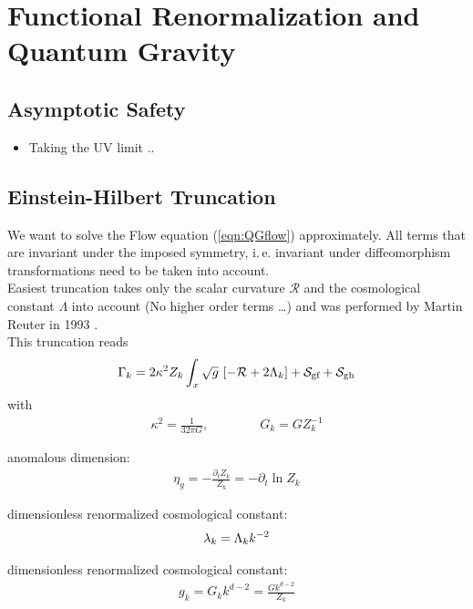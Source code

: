 \chapter{Functional Renormalization and Quantum Gravity}\label{chap:EHT}
\section{Asymptotic Safety}
\begin{itemize}
	\item Taking the UV limit ..
\end{itemize}
\section{Einstein-Hilbert Truncation}
We want to solve the Flow equation (\ref{eqn:QGflow}) approximately. All terms that are invariant under the imposed symmetry, i.\,e. invariant under diffeomorphism transformations need to be taken into account. \\

Easiest truncation takes only the scalar curvature $\mathcal{R}$ and the cosmological constant $\Lambda$ into account (No higher order terms \dots) and was performed by Martin Reuter in 1993 \cite{ReuterSaueressig2002}. \\


This truncation reads
\begin{align}
	\Gamma_{k} = 2\kappa^2Z_k \int_x \sqrt{g} \ [-\mathcal{R} + 2\Lambda_k] + \mathcal{S}_{\text{gf}} + \mathcal{S}_{\text{gh}}
\label{eqn:QGflow}
\end{align}
with 
\begin{align}
	\kappa^2 = \frac{1}{32\pi G}, \qquad\qquad G_k = GZ^{-1}_k
\end{align}



anomalous dimension: 
\begin{align*}
	\eta_g = -\frac{\partial_t Z_k}{Z_k} = -\partial_t \ln Z_k
\end{align*}

dimensionless renormalized cosmological constant:
\begin{align*}
	\lambda_k = \Lambda_k k^{-2}
\end{align*}

dimensionless renormalized cosmological constant:
\begin{align*}
	g_k = G_k k^{d-2} = \frac{Gk^{d-2}}{Z_k}
\end{align*}

